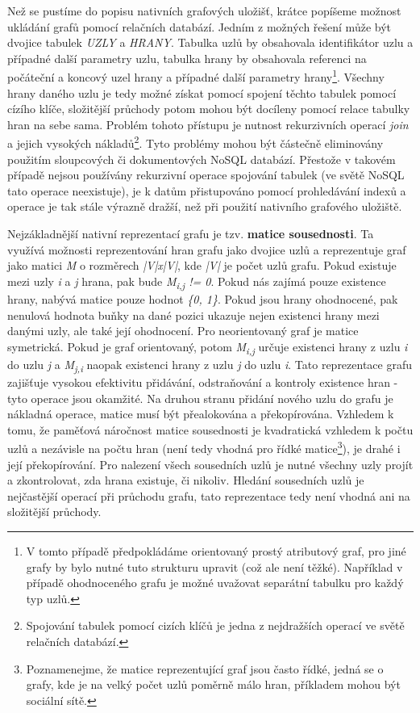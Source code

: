 Než se pustíme do popisu nativních grafových uložišť, krátce popíšeme možnost ukládání grafů pomocí relačních databází. Jedním z možných řešení může být dvojice tabulek \textit{UZLY} a \textit{HRANY}. Tabulka uzlů by obsahovala identifikátor uzlu a případné další parametry uzlu, tabulka hrany by obsahovala referenci na počáteční a koncový uzel hrany a případné další parametry hrany\footnote{V tomto případě předpokládáme orientovaný prostý atributový graf, pro jiné grafy by bylo nutné tuto strukturu upravit (což ale není těžké). Například v případě ohodnoceného grafu je možné uvažovat separátní tabulku pro každý typ uzlů.}. Všechny hrany daného uzlu je tedy možné získat pomocí spojení těchto tabulek pomocí cízího klíče, složitější průchody potom mohou být docíleny pomocí relace tabulky hran na sebe sama. Problém tohoto přístupu je nutnost rekurzivních operací \textit{join} a jejich vysokých nákladů\footnote{Spojování tabulek pomocí cizích klíčů je jedna z nejdražších operací ve světě relačních databází.}. Tyto problémy mohou být částečně eliminovány použitím sloupcových či dokumentových NoSQL databází. Přestože v takovém případě nejsou používány rekurzivní operace spojování tabulek (ve světě NoSQL tato operace neexistuje), je k datům přistupováno pomocí prohledávání indexů a operace je tak stále výrazně dražší, než při použití nativního grafového uložiště.\cite{Lal15} 

Nejzákladnější nativní reprezentací grafu je tzv. \textbf{matice sousednosti}. Ta využívá možnosti reprezentování hran grafu jako dvojice uzlů a reprezentuje graf jako matici \textit{M} o rozměrech \textit{|V|x|V|}, kde \textit{|V|} je počet uzlů grafu. Pokud existuje mezi uzly \textit{i} a \textit{j} hrana, pak bude \textit{M\textsubscript{i,j} != 0}. 
Pokud nás zajímá pouze existence hrany, nabývá matice pouze hodnot \textit{\{0, 1\}}. Pokud jsou hrany ohodnocené, pak nenulová hodnota buňky na dané pozici ukazuje nejen existenci hrany mezi danými uzly, ale také její ohodnocení. Pro neorientovaný graf je matice symetrická. Pokud je graf orientovaný, potom \textit{M\textsubscript{i,j}} určuje existenci hrany z uzlu \textit{i} do uzlu \textit{j} a \textit{M\textsubscript{j,i}} naopak existenci hrany z uzlu \textit{j} do uzlu \textit{i}. 
Tato reprezentace grafu zajišťuje vysokou efektivitu přidávání, odstraňování a kontroly existence hran - tyto operace jsou okamžité.  Na druhou stranu přidání nového uzlu do grafu je nákladná operace, matice musí být přealokována a překopírována. Vzhledem k tomu, že paměťová náročnost matice sousednosti je kvadratická vzhledem k počtu uzlů a nezávisle na počtu hran (není tedy vhodná pro řídké matice\footnote{Poznamenejme, že matice reprezentující graf jsou často řídké, jedná se o grafy, kde je na velký počet uzlů poměrně málo hran, příkladem mohou být sociální sítě.}), je drahé i její překopírování. 
Pro nalezení všech sousedních uzlů je nutné všechny uzly projít a zkontrolovat, zda hrana existuje, či nikoliv. Hledání sousedních uzlů je nejčastější operací při průchodu grafu, tato reprezentace tedy není vhodná ani na složitější průchody.

